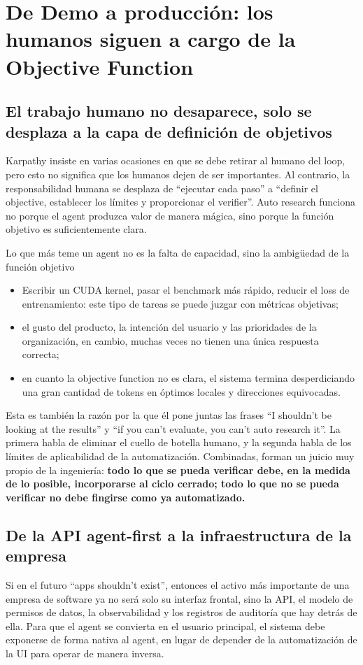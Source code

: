 \section{De Demo a producción: los humanos siguen a cargo de la Objective Function}

\subsection{El trabajo humano no desaparece, solo se desplaza a la capa de definición de objetivos}
Karpathy insiste en varias ocasiones en que se debe retirar al humano del loop, pero esto no significa que los humanos dejen de ser importantes. Al contrario, la responsabilidad humana se desplaza de ``ejecutar cada paso'' a ``definir el objective, establecer los límites y proporcionar el verifier''. Auto research funciona no porque el agent produzca valor de manera mágica, sino porque la función objetivo es suficientemente clara.

\begin{importantbox}{Lo que más teme un agent no es la falta de capacidad, sino la ambigüedad de la función objetivo}
\begin{itemize}
    \item Escribir un CUDA kernel, pasar el benchmark más rápido, reducir el loss de entrenamiento: este tipo de tareas se puede juzgar con métricas objetivas;
    \item el gusto del producto, la intención del usuario y las prioridades de la organización, en cambio, muchas veces no tienen una única respuesta correcta;
    \item en cuanto la objective function no es clara, el sistema termina desperdiciando una gran cantidad de tokens en óptimos locales y direcciones equivocadas.
\end{itemize}
\end{importantbox}

Esta es también la razón por la que él pone juntas las frases ``I shouldn't be looking at the results'' y ``if you can't evaluate, you can't auto research it''. La primera habla de eliminar el cuello de botella humano, y la segunda habla de los límites de aplicabilidad de la automatización. Combinadas, forman un juicio muy propio de la ingeniería: \textbf{todo lo que se pueda verificar debe, en la medida de lo posible, incorporarse al ciclo cerrado; todo lo que no se pueda verificar no debe fingirse como ya automatizado.}

\subsection{De la API agent-first a la infraestructura de la empresa}
Si en el futuro ``apps shouldn't exist'', entonces el activo más importante de una empresa de software ya no será solo su interfaz frontal, sino la API, el modelo de permisos de datos, la observabilidad y los registros de auditoría que hay detrás de ella. Para que el agent se convierta en el usuario principal, el sistema debe exponerse de forma nativa al agent, en lugar de depender de la automatización de la UI para operar de manera inversa.

